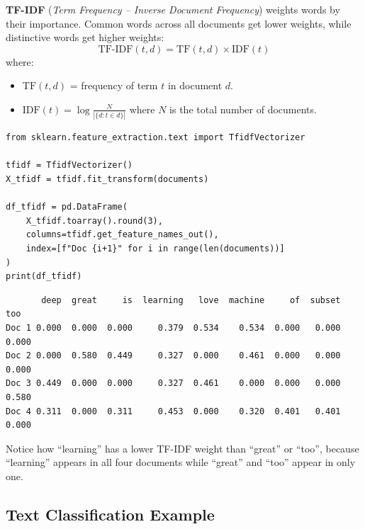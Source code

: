 
\begin{definition}[TF-IDF]
\textbf{TF-IDF} (\textit{Term Frequency -- Inverse Document Frequency}) weights words by their importance. Common words across all documents get lower weights, while distinctive words get higher weights:
\[
\text{TF-IDF}(t, d) = \text{TF}(t, d) \times \text{IDF}(t)
\]
where:
\begin{itemize}
    \item $\text{TF}(t, d)$ = frequency of term $t$ in document $d$.
    \item $\text{IDF}(t) = \log\frac{N}{|\{d : t \in d\}|}$ where $N$ is the total number of documents.
\end{itemize}
\end{definition}

\begin{codeblock}[title=\textbf{Python}]
\begin{verbatim}
from sklearn.feature_extraction.text import TfidfVectorizer

tfidf = TfidfVectorizer()
X_tfidf = tfidf.fit_transform(documents)

df_tfidf = pd.DataFrame(
    X_tfidf.toarray().round(3),
    columns=tfidf.get_feature_names_out(),
    index=[f"Doc {i+1}" for i in range(len(documents))]
)
print(df_tfidf)
\end{verbatim}
\end{codeblock}

\begin{codeoutput}
\begin{verbatim}
       deep  great     is  learning   love  machine     of  subset    too
Doc 1 0.000  0.000  0.000     0.379  0.534    0.534  0.000   0.000  0.000
Doc 2 0.000  0.580  0.449     0.327  0.000    0.461  0.000   0.000  0.000
Doc 3 0.449  0.000  0.000     0.327  0.461    0.000  0.000   0.000  0.580
Doc 4 0.311  0.000  0.311     0.453  0.000    0.320  0.401   0.401  0.000
\end{verbatim}
\end{codeoutput}

\begin{remark}
Notice how ``learning'' has a lower TF-IDF weight than ``great'' or ``too'', because ``learning'' appears in all four documents while ``great'' and ``too'' appear in only one.
\end{remark}

\subsection{Text Classification Example}

